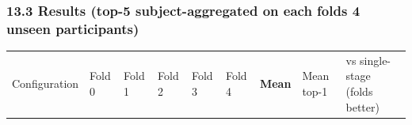 \documentclass[
  11pt,
]{article}
\newcounter{none} %
\renewcommand{\_}{\oldunderscore\allowbreak}
\begin{document}
\subsubsection{13.3 Results (top-5
subject-aggregated on each
fold\textquotesingle s 4 unseen
participants)}\label{results-top-5-subject-aggregated-on-each-folds-4-unseen-participants}

{\def\LTcaptype{none} %
\begin{longtable}[]{@{}
  >{\raggedright\arraybackslash}p{}
  >{\raggedright\arraybackslash}p{}
  >{\raggedright\arraybackslash}p{}
  >{\raggedright\arraybackslash}p{}
  >{\raggedright\arraybackslash}p{}
  >{\raggedright\arraybackslash}p{}
  >{\raggedright\arraybackslash}p{}
  >{\raggedright\arraybackslash}p{}
  >{\raggedright\arraybackslash}p{}@{}}
\toprule\noalign{}
\begin{minipage}[b]{\linewidth}\raggedright
Configuration
\end{minipage} &
\begin{minipage}[b]{\linewidth}\raggedright
Fold 0
\end{minipage} &
\begin{minipage}[b]{\linewidth}\raggedright
Fold 1
\end{minipage} &
\begin{minipage}[b]{\linewidth}\raggedright
Fold 2
\end{minipage} &
\begin{minipage}[b]{\linewidth}\raggedright
Fold 3
\end{minipage} &
\begin{minipage}[b]{\linewidth}\raggedright
Fold 4
\end{minipage} &
\begin{minipage}[b]{\linewidth}\raggedright
\textbf{Mean}
\end{minipage} &
\begin{minipage}[b]{\linewidth}\raggedright
Mean top-1
\end{minipage} &
\begin{minipage}[b]{\linewidth}\raggedright
vs single-stage (folds better)
\end{minipage} \\

\end{longtable}}
\end{document}
